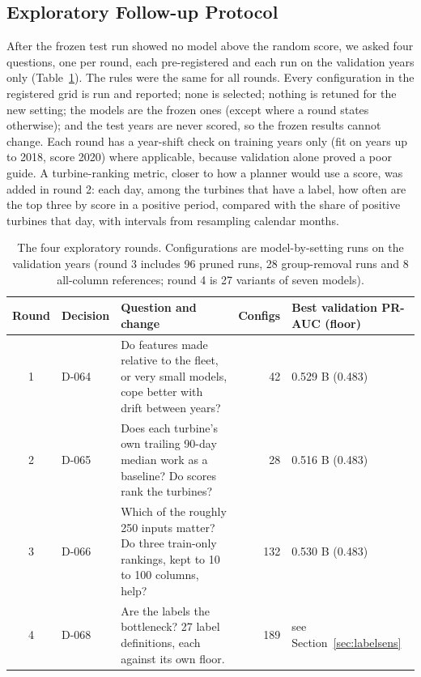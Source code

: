 \documentclass[12pt,a4paper]{article}
\begin{document}
	\subsection{Exploratory Follow-up Protocol}\label{sec:explmeth}
	After the frozen test run showed no model above the random score, we asked four questions, one per round, each pre-registered and each run on the validation years only (Table~\ref{tab:rounds}). The rules were the same for all rounds. Every configuration in the registered grid is run and reported; none is selected; nothing is retuned for the new setting; the models are the frozen ones (except where a round states otherwise); and the test years are never scored, so the frozen results cannot change. Each round has a year-shift check on training years only (fit on years up to 2018, score 2020) where applicable, because validation alone proved a poor guide. A turbine-ranking metric, closer to how a planner would use a score, was added in round 2: each day, among the turbines that have a label, how often are the top three by score in a positive period, compared with the share of positive turbines that day, with intervals from resampling calendar months.

	\begin{table}[htbp]
	\centering
	\footnotesize
	\begin{tabularx}{\linewidth}{@{}clXrl@{}}
	\toprule
	Round & Decision & Question and change & Configs & Best validation PR-AUC (floor) \\
	\midrule
	1 & D-064 & Do features made relative to the fleet, or very small models, cope better with drift between years? & 42 & 0.529 B (0.483) \\
	2 & D-065 & Does each turbine's own trailing 90-day median work as a baseline? Do scores rank the turbines? & 28 & 0.516 B (0.483) \\
	3 & D-066 & Which of the roughly 250 inputs matter? Do three train-only rankings, kept to 10 to 100 columns, help? & 132 & 0.530 B (0.483) \\
	4 & D-068 & Are the labels the bottleneck? 27 label definitions, each against its own floor. & 189 & see Section~\ref{sec:labelsens} \\
	\bottomrule
	\end{tabularx}
	\caption{The four exploratory rounds. Configurations are model-by-setting runs on the validation years (round 3 includes 96 pruned runs, 28 group-removal runs and 8 all-column references; round 4 is 27 variants of seven models).}
	\label{tab:rounds}
	\end{table}
\end{document}

